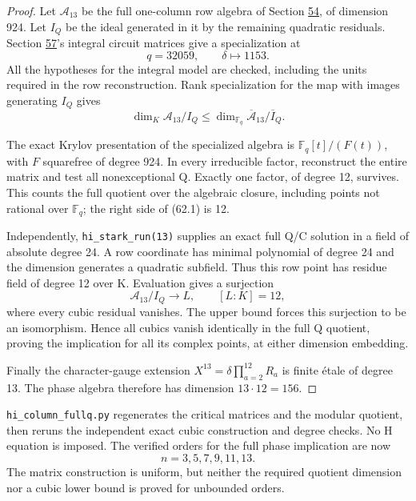 \documentclass[11pt,reqno]{amsart}
\theoremstyle{plain}
\begin{document}
\begin{proof}
Let \(\mathcal A_{13}\) be the full one-column row algebra
of Section \hyperref[sec:54]{54}, of dimension 924. Let \(I_Q\) be the ideal generated
in it by the remaining quadratic residuals. Section \hyperref[sec:57]{57}'s integral
circuit matrices give a specialization at
\[
 q=32059,\qquad\delta\mapsto1153.
\]
All the hypotheses for the integral model are checked, including the
units required in the row reconstruction. Rank specialization for the
map with images generating \(I_Q\) gives
\begin{equation*}
 \dim_K\mathcal A_{13}/I_Q
 \le\dim_{\mathbb F_q}\overline{\mathcal A}_{13}/\overline I_Q.
 \tag{62.1}
\end{equation*}

The exact Krylov presentation of the specialized algebra is
\(\mathbb F_q[t]/(F(t))\), with \(F\) squarefree of degree 924.
In every irreducible factor, reconstruct the entire matrix and test
all nonexceptional Q. Exactly one factor, of degree 12, survives.
This counts the full quotient over the algebraic closure, including
points not rational over \(\mathbb F_q\); the right side of (62.1)
is 12.

Independently, \texttt{hi\_\allowbreak stark\_\allowbreak run(13)} supplies an exact full Q/C solution
in a field of absolute degree 24. A row coordinate has minimal
polynomial of degree 24 and the dimension generates a quadratic
subfield. Thus this row point has residue field of degree 12 over K.
Evaluation gives a surjection
\[
 \mathcal A_{13}/I_Q\longrightarrow L,\qquad [L:K]=12,
\]
where every cubic residual vanishes. The upper bound forces this
surjection to be an isomorphism. Hence all cubics vanish identically
in the full Q quotient, proving the implication for all its complex
points, at either dimension embedding.

Finally the character-gauge extension
\(X^{13}=\delta\prod_{a=2}^{12}R_a\) is finite \'etale of degree 13.
The phase algebra therefore has dimension \(13\cdot12=156\).
\end{proof}

\texttt{hi\_\allowbreak column\_\allowbreak fullq.py} regenerates the critical matrices and the modular
quotient, then reruns the independent exact cubic construction and
degree checks. No H equation is imposed. The verified orders for the
full phase implication are now
\[
 n=3,5,7,9,11,13.
\]
The matrix construction is uniform, but neither the required quotient
dimension nor a cubic lower bound is proved for unbounded orders.
\end{document}
